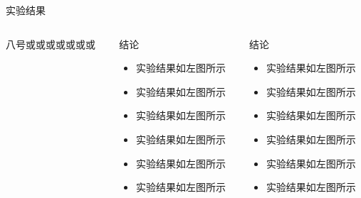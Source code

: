 \documentclass[8pt,compress,t,notheorems,noamsthm,notheorem,xcolor=x11names]{beamer}
\theoremstyle{nonumberplain}%
\theoremstyle{plain}
\begin{document}
\begin{frame}{实验结果}
\begin{columns}[T]
	\begin{column}{0.30\textwidth}
		八号或或或或或或或
	\end{column}
	\begin{column}{0.30\textwidth}
		\begin{Block}{结论}
			\begin{itemize}
				\item 实验结果如左图所示
				\item 实验结果如左图所示
				\item 实验结果如左图所示
				\item 实验结果如左图所示
				\item 实验结果如左图所示
				\item 实验结果如左图所示
			\end{itemize}
		\end{Block}
	\end{column}
	
	\begin{column}{0.30\textwidth}
		\begin{block}{结论}
			\begin{itemize}
				\item 实验结果如左图所示
				\item 实验结果如左图所示
				\item 实验结果如左图所示
				\item 实验结果如左图所示
				\item 实验结果如左图所示
				\item 实验结果如左图所示
			\end{itemize}
		\end{block}
	\end{column}
\end{columns}
\end{frame}
\end{document}
